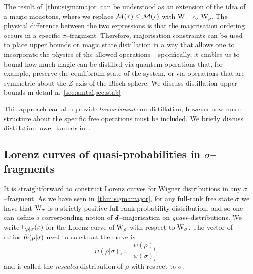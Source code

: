 \documentclass[pra,
aps,
twocolumn,
superscriptaddress,
groupedaddress,
nofootinbib,
reprint
]{revtex4-1}
\begin{document}
The result of~\cref{thm:sigmamajor} can be understood as an extension of the idea of a magic monotone, where we replace $\mathcal{M}(\tau) \leq \mathcal{M}(\rho)$ with $\W{\tau} \prec_\sigma \W{\rho}$. 
The physical difference between the two expressions is that the majorisation ordering occurs in a specific $\sigma$--fragment.
Therefore, majorisation constraints can be used to place upper bounds on magic state distillation in a way that allows one to incorporate the physics of the allowed operations -- specifically, it enables us to bound how much magic can be distilled via quantum operations that, for example, preserve the equilibrium state of the system, or via operations that are symmetric about the $Z$-axis of the Bloch sphere.
We discuss distillation upper bounds in detail in~\cref{sec:unital,sec:stab}

This approach can also provide \emph{lower bounds} on distillation, however now more structure about the specific free operations must be included. 
We briefly discuss distillation lower bounds in~.


\subsection{Lorenz curves of quasi-probabilities in $\sigma$--fragments}
\label{sec:lc}

It is straightforward to construct Lorenz curves for Wigner distributions in any $\sigma$--fragment.
As we have seen in~\cref{thm:sigmamajor}, for any full-rank free state $\sigma$ we have that $\W{\sigma}$ is a strictly positive full-rank probability distribution, and so one can define a corresponding notion of $\bm{d}$--majorisation on \emph{quasi}--distributions.
We write ${{\rm{L}}_{\rho|\sigma}}(x)$ for the Lorenz curve of $\W{\rho}$ with respect to $\W{\sigma}$.
The vector of ratios $\widetilde{\bm{w}}(\rho|\sigma)$ used to construct the curve is
\begin{equation}
	\widetilde{w}(\rho|\sigma)_i \coloneqq \frac{w(\rho)_i}{w(\sigma)_i},
\end{equation}
and is called the \emph{rescaled} distribution of $\rho$ with respect to $\sigma$.
\end{document}
